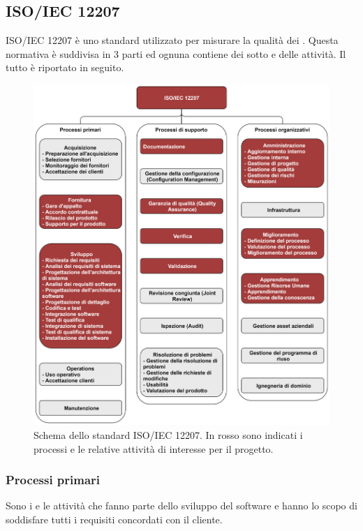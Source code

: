 \subsection{ISO/IEC 12207}
ISO/IEC 12207 è uno standard utilizzato per misurare la qualità dei . Questa normativa è suddivisa in 3 parti
ed ognuna contiene dei sotto  e delle attività. Il tutto è riportato in seguito. 

\begin{figure}[h]
    \centering
    \includegraphics[scale=0.53]{Sezioni/Immagini/IsoIec12207.png}
    \caption{Schema dello standard ISO/IEC 12207. In rosso sono indicati i processi e le relative attività di interesse per il progetto.}
\end{figure}

\subsubsection{Processi primari}
Sono i  e le attività che fanno parte dello sviluppo del software e hanno lo scopo di soddisfare tutti i requisiti concordati con il cliente.

